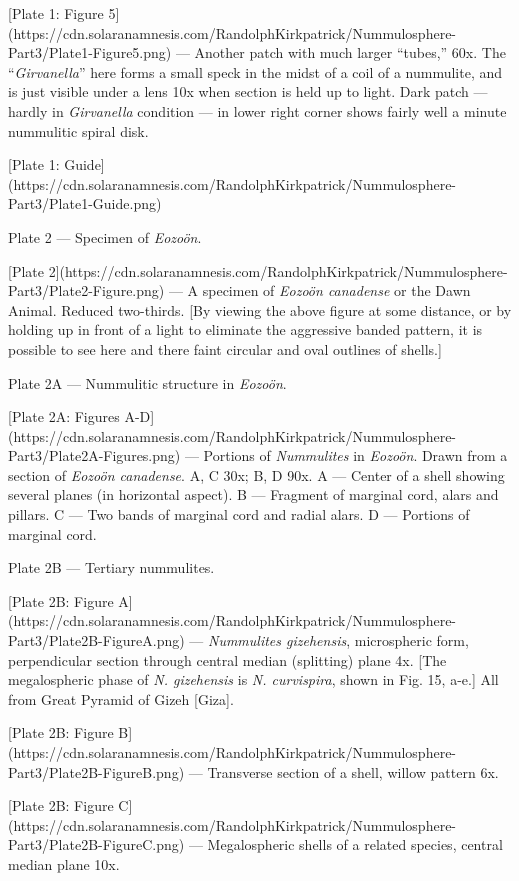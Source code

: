 \documentclass[a4paper, 12pt, oneside]{article}
\begin{document}
[Plate 1: Figure 5](https://cdn.solaranamnesis.com/RandolphKirkpatrick/Nummulosphere-Part3/Plate1-Figure5.png) --- Another patch with much larger ``tubes,'' 60x. The ``\emph{Girvanella}'' here forms a small speck in the midst of a coil of a nummulite, and is just visible under a lens 10x when section is held up to light. Dark patch --- hardly in \emph{Girvanella} condition --- in lower right corner shows fairly well a minute nummulitic spiral disk.

[Plate 1: Guide](https://cdn.solaranamnesis.com/RandolphKirkpatrick/Nummulosphere-Part3/Plate1-Guide.png)

Plate 2 --- Specimen of \emph{Eozoön}.

[Plate 2](https://cdn.solaranamnesis.com/RandolphKirkpatrick/Nummulosphere-Part3/Plate2-Figure.png) --- A specimen of \emph{Eozoön canadense} or the Dawn Animal. Reduced two-thirds. [By viewing the above figure at some distance, or by holding up in front of a light to eliminate the aggressive banded pattern, it is possible to see here and there faint circular and oval outlines of shells.]

Plate 2A --- Nummulitic structure in \emph{Eozoön}.

[Plate 2A: Figures A-D](https://cdn.solaranamnesis.com/RandolphKirkpatrick/Nummulosphere-Part3/Plate2A-Figures.png) --- Portions of \emph{Nummulites} in \emph{Eozoön}. Drawn from a section of \emph{Eozoön canadense}. A, C 30x; B, D 90x. A --- Center of a shell showing several planes (in horizontal aspect). B --- Fragment of marginal cord, alars and pillars. C --- Two bands of marginal cord and radial alars. D --- Portions of marginal cord.

Plate 2B --- Tertiary nummulites.

[Plate 2B: Figure A](https://cdn.solaranamnesis.com/RandolphKirkpatrick/Nummulosphere-Part3/Plate2B-FigureA.png) --- \emph{Nummulites gizehensis}, microspheric form, perpendicular section through central median (splitting) plane 4x. [The megalospheric phase of \emph{N. gizehensis} is \emph{N. curvispira}, shown in Fig. 15, a-e.] All from Great Pyramid of Gizeh [Giza].

[Plate 2B: Figure B](https://cdn.solaranamnesis.com/RandolphKirkpatrick/Nummulosphere-Part3/Plate2B-FigureB.png) --- Transverse section of a shell, willow pattern 6x.

[Plate 2B: Figure C](https://cdn.solaranamnesis.com/RandolphKirkpatrick/Nummulosphere-Part3/Plate2B-FigureC.png) --- Megalospheric shells of a related species, central median plane 10x.
\end{document}
